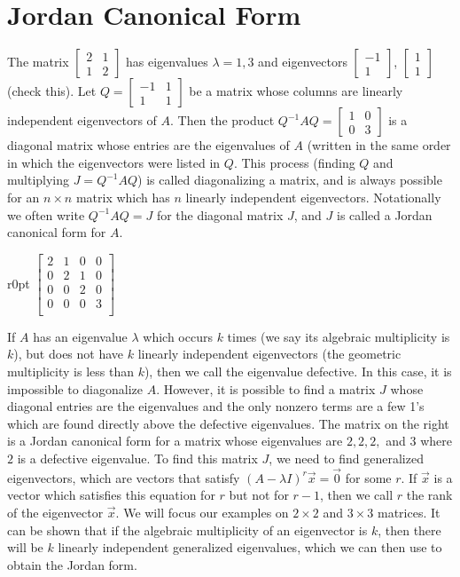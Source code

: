 \documentclass[10pt]{article}
\theoremstyle{plain}
\theoremstyle{box}
\begin{document}
\section{Jordan Canonical Form}
The matrix $\begin{bmatrix} 2&1\\1&2\end{bmatrix} $ has eigenvalues $\lambda=1,3$ and eigenvectors $\begin{bmatrix} -1\\1\end{bmatrix} $, $\begin{bmatrix} 1\\1\end{bmatrix} $ (check this). Let $Q = \begin {bmatrix} -1&1\\1&1\end {bmatrix} $ be a matrix whose columns are linearly independent eigenvectors of $A$.  Then the product $Q^{-1}AQ = \begin {bmatrix} 1&0\\0&3\end {bmatrix}$ is a diagonal matrix whose entries are the eigenvalues of $A$ (written in the same order in which the eigenvectors were listed in $Q$.  This process (finding $Q$ and multiplying $J=Q^{-1}AQ$) is called diagonalizing a matrix, and is always possible for an $n\times n$ matrix which has $n$ linearly independent eigenvectors. Notationally we often write $Q^{-1}AQ=J$ for the diagonal matrix $J$, and $J$ is called a Jordan canonical form for $A$.  

\begin{wraptable}{r}{0pt}
$\begin{bmatrix}
2&1&0&0\\
0&2&1&0\\
0&0&2&0\\
0&0&0&3\\
\end{bmatrix}$
\end{wraptable}
If $A$ has an eigenvalue $\lambda$ which occurs $k$ times (we say its algebraic multiplicity is $k$), but does not have $k$ linearly independent eigenvectors (the geometric multiplicity is less than $k$), then we call the eigenvalue defective. In this case, it is impossible to diagonalize $A$. However, it is possible to find a matrix $J$ whose diagonal entries are the eigenvalues and the only nonzero terms are a few 1's which are found directly above the defective eigenvalues. The matrix on the right 
 is a Jordan canonical form for a matrix whose eigenvalues are $2,2,2,$ and $3$ where $2$ is a defective eigenvalue. To find this matrix $J$, we need to find generalized eigenvectors, which are vectors that satisfy $(A-\lambda I)^r\vec x=\vec 0$ for some $r$.  If $\vec x$ is a vector which satisfies this equation for $r$ but not for $r-1$, then we call $r$ the rank of the eigenvector $\vec x$. We will focus our examples on $2\times 2$ and $3\times 3$ matrices. It can be shown that if the algebraic multiplicity of an eigenvector is $k$, then there will be $k$ linearly independent generalized eigenvalues, which we can then use to obtain the Jordan form.
\end{document}
